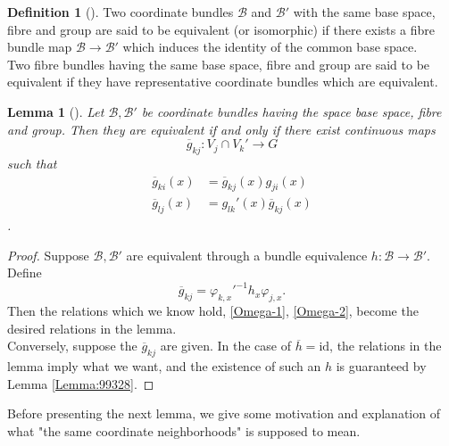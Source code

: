 \documentclass[reqno]{amsart}
\newtheorem{lemma}[theorem]{Lemma}
\theoremstyle{definition}
\newtheorem{definition}[theorem]{Definition}
\theoremstyle{remark}
\newcommand{\id}{{\mathrm{id}}}
\begin{document}
\begin{definition}[]
    Two coordinate bundles 
    $\mathcal{B}$ and $\mathcal{B}'$ with the same
    base space, fibre and group are said to be
    equivalent (or isomorphic) if there exists a fibre bundle
    map $\mathcal{B}\to \mathcal{B}'$ which induces the
    identity of the common base space.\\
    Two fibre bundles having the same base space,
    fibre and group are said to be equivalent if they
    have representative coordinate bundles which are
    equivalent.
\end{definition}

\begin{lemma}[]\label{bundle-equiv-in-terms-of-maps}
    Let $\mathcal{B},\mathcal{B}'$ be coordinate bundles
    having the space base space, fibre and group. Then
    they are equivalent if and only if
    there exist continuous maps
    \[
    \overline{g}_{kj} \colon V_j \cap V_{k}' \to G
    \] 
    such that
    \begin{align*}
        \overline{g}_{ki}(x) 
        &= \overline{g}_{kj}(x) g_{ji}(x)\\
        \overline{g}_{lj}(x) 
        &= g_{lk}'(x) \overline{g}_{kj}(x)
    \end{align*}.
\end{lemma}

\begin{proof}
    Suppose $\mathcal{B},\mathcal{B'}$ are equivalent through
    a bundle equivalence $h \colon \mathcal{B}\to 
    \mathcal{B}'$. Define 
     \[
    \overline{g}_{kj} = \varphi_{k,x}'^{-1} h_x \varphi_{j,x}.
    \] 
    Then the relations which we know hold,
    \eqref{Omega-1}, \eqref{Omega-2}, become the
    desired relations in the lemma.\\
    Conversely, suppose
    the  $\overline{g}_{kj}$ are given. 
    In the case of $\overline{h} = \id$, the
    relations in the lemma imply
    what we want, and the existence of such an
    $h$ is guaranteed by Lemma \ref{Lemma:99328}.
\end{proof}



Before presenting the next lemma, we give some motivation
and explanation of what "the same coordinate neighborhoods" is
supposed to mean.
\end{document}
